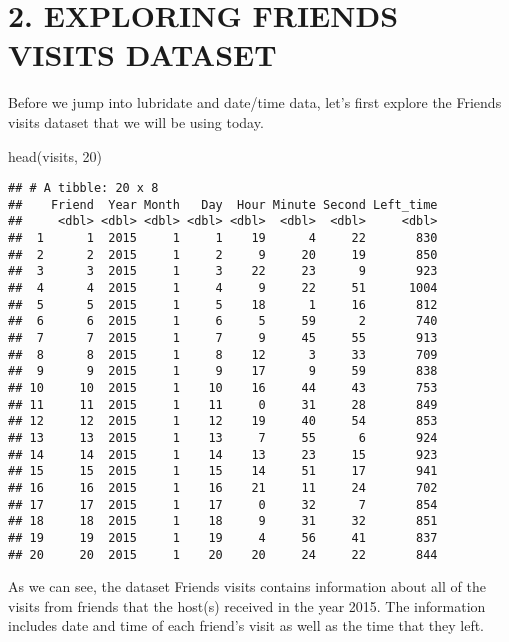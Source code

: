 \documentclass[
]{book}
\newenvironment{Shaded}{\begin{snugshade}}{\end{snugshade}}
\newcommand{\DecValTok}[1]{\textcolor[rgb]{0.00,0.00,0.81}{#1}}
\newcommand{\FunctionTok}[1]{\textcolor[rgb]{0.00,0.00,0.00}{#1}}
\newcommand{\NormalTok}[1]{#1}
\begin{document}
\hypertarget{exploring-friends-visits-dataset}{%
\section{2. EXPLORING FRIENDS VISITS DATASET}\label{exploring-friends-visits-dataset}}

Before we jump into lubridate and date/time data, let's first explore the Friends visits dataset that we will be using today.

\begin{Shaded}
\begin{Highlighting}[]
\FunctionTok{head}\NormalTok{(visits, }\DecValTok{20}\NormalTok{)}
\end{Highlighting}
\end{Shaded}

\begin{verbatim}
## # A tibble: 20 x 8
##    Friend  Year Month   Day  Hour Minute Second Left_time
##     <dbl> <dbl> <dbl> <dbl> <dbl>  <dbl>  <dbl>     <dbl>
##  1      1  2015     1     1    19      4     22       830
##  2      2  2015     1     2     9     20     19       850
##  3      3  2015     1     3    22     23      9       923
##  4      4  2015     1     4     9     22     51      1004
##  5      5  2015     1     5    18      1     16       812
##  6      6  2015     1     6     5     59      2       740
##  7      7  2015     1     7     9     45     55       913
##  8      8  2015     1     8    12      3     33       709
##  9      9  2015     1     9    17      9     59       838
## 10     10  2015     1    10    16     44     43       753
## 11     11  2015     1    11     0     31     28       849
## 12     12  2015     1    12    19     40     54       853
## 13     13  2015     1    13     7     55      6       924
## 14     14  2015     1    14    13     23     15       923
## 15     15  2015     1    15    14     51     17       941
## 16     16  2015     1    16    21     11     24       702
## 17     17  2015     1    17     0     32      7       854
## 18     18  2015     1    18     9     31     32       851
## 19     19  2015     1    19     4     56     41       837
## 20     20  2015     1    20    20     24     22       844
\end{verbatim}

As we can see, the dataset Friends visits contains information about all of the visits from friends that the host(s) received in the year 2015. The information includes date and time of each friend's visit as well as the time that they left.
\end{document}
